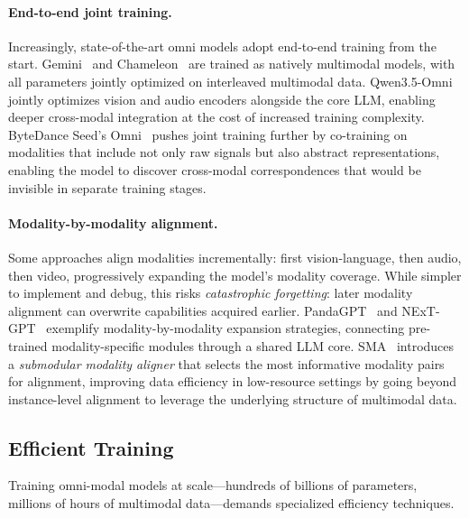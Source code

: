 \documentclass{article}
\begin{document}
\paragraph{End-to-end joint training.}
Increasingly, state-of-the-art omni models adopt end-to-end training from the start.
Gemini~\cite{google2024gemini} and Chameleon~\cite{jiang2024chameleon} are trained as natively multimodal models, with all parameters jointly optimized on interleaved multimodal data.
Qwen3.5-Omni~\cite{qwen2026omni} jointly optimizes vision and audio encoders alongside the core LLM, enabling deeper cross-modal integration at the cost of increased training complexity.
ByteDance Seed's Omni~\cite{seed2026omni} pushes joint training further by co-training on modalities that include not only raw signals but also abstract representations, enabling the model to discover cross-modal correspondences that would be invisible in separate training stages.

\paragraph{Modality-by-modality alignment.}
Some approaches align modalities incrementally: first vision-language, then audio, then video, progressively expanding the model's modality coverage.
While simpler to implement and debug, this risks \emph{catastrophic forgetting}: later modality alignment can overwrite capabilities acquired earlier.
PandaGPT~\cite{su2023pandagpt} and NExT-GPT~\cite{wu2024nextgpt} exemplify modality-by-modality expansion strategies, connecting pre-trained modality-specific modules through a shared LLM core.
SMA~\cite{placeholder2026sma} introduces a \emph{submodular modality aligner} that selects the most informative modality pairs for alignment, improving data efficiency in low-resource settings by going beyond instance-level alignment to leverage the underlying structure of multimodal data.

\subsection{Efficient Training}

Training omni-modal models at scale---hundreds of billions of parameters, millions of hours of multimodal data---demands specialized efficiency techniques.
\end{document}

